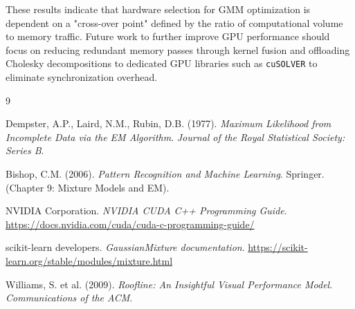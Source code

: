 \documentclass[10pt]{article}
\begin{document}
These results indicate that hardware selection for GMM optimization is dependent on a "cross-over point" defined by the ratio of computational volume to memory traffic. Future work to further improve GPU performance should focus on reducing redundant memory passes through kernel fusion and offloading Cholesky decompositions to dedicated GPU libraries such as \texttt{cuSOLVER} to eliminate synchronization overhead.

\newpage
\begin{thebibliography}{9}

Dempster, A.P., Laird, N.M., Rubin, D.B. (1977).
\textit{Maximum Likelihood from Incomplete Data via the EM Algorithm}. \textit{Journal of the Royal Statistical Society: Series B}.

Bishop, C.M. (2006).
\textit{Pattern Recognition and Machine Learning}. Springer. (Chapter 9: Mixture Models and EM).

NVIDIA Corporation.
\textit{NVIDIA CUDA C++ Programming Guide}. \url{https://docs.nvidia.com/cuda/cuda-c-programming-guide/}

scikit-learn developers.
\textit{GaussianMixture documentation}. \url{https://scikit-learn.org/stable/modules/mixture.html}

Williams, S. et al. (2009).
\textit{Roofline: An Insightful Visual Performance Model}. \textit{Communications of the ACM}.

\end{thebibliography}
\end{document}
